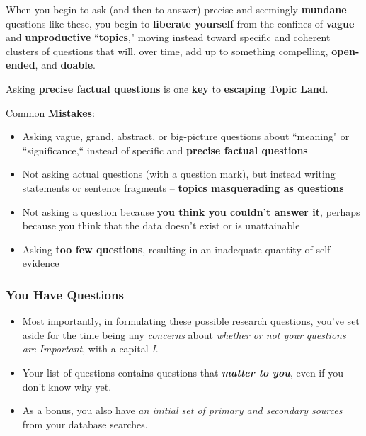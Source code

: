 \documentclass[11pt]{article}
\begin{document}
\begin{itemize}
\begin{exercise}
When you begin to ask (and then to answer) precise and seemingly \textbf{mundane} questions like these, you begin to \textbf{liberate yourself} from the confines of \textbf{vague} and \textbf{unproductive} ``\textbf{topics}," moving instead toward specific and coherent clusters of questions that will, over time, add up to something compelling, \textbf{open-ended}, and \textbf{doable}.

Asking \textbf{precise factual questions} is one \textbf{key} to \textbf{escaping} \textbf{Topic Land}.
\end{exercise}
Common \textbf{Mistakes}:
\begin{itemize}
\item Asking vague, grand, abstract, or big-picture questions about ``meaning" or ``significance,“ instead of specific and \textbf{precise factual questions}
\item Not asking actual questions (with a question mark), but instead writing statements or sentence fragments -- \textbf{topics masquerading as questions}
\item Not asking a question because \textbf{you think you couldn’t answer it}, perhaps because you think that the data doesn’t exist or is unattainable
\item Asking \textbf{too few questions}, resulting in an inadequate quantity of self-evidence
\end{itemize}
\end{itemize}

\subsubsection{You Have Questions}
\begin{itemize}
\item Most importantly, in formulating these possible research questions, you’ve set aside for the time being any \emph{concerns} about \emph{whether or not your questions are Important}, with a capital \emph{I}.

\item Your list of questions contains questions that \emph{\textbf{matter to you}}, even if you don’t know why yet. 

\item As a bonus, you also have \emph{an initial set of primary and secondary sources} from your database searches.
\end{itemize}
\end{document}
